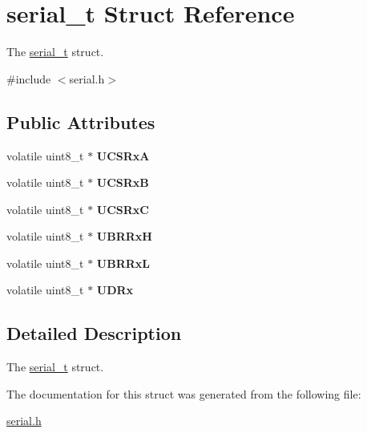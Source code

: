 \hypertarget{structserial__t}{}\section{serial\+\_\+t Struct Reference}
\label{structserial__t}


The \hyperlink{structserial__t}{serial\+\_\+t} struct.  




{\ttfamily \#include $<$serial.\+h$>$}

\subsection*{Public Attributes}
\begin{DoxyCompactItemize}
\item 
\mbox{\label{structserial__t_a217e81ee8801f862b447e651016bb71b}} 
volatile uint8\+\_\+t $\ast$ {\bfseries U\+C\+S\+RxA}
\item 
\mbox{\label{structserial__t_a2e14c00b5f729305a98f44927d91fa65}} 
volatile uint8\+\_\+t $\ast$ {\bfseries U\+C\+S\+RxB}
\item 
\mbox{\label{structserial__t_aeb6357850a478ff1c9f50f342764ed3a}} 
volatile uint8\+\_\+t $\ast$ {\bfseries U\+C\+S\+RxC}
\item 
\mbox{\label{structserial__t_ae458e42ede033302f20deeb82d51d282}} 
volatile uint8\+\_\+t $\ast$ {\bfseries U\+B\+R\+RxH}
\item 
\mbox{\label{structserial__t_a9f1c7df5c88c819e1b858fede2735e82}} 
volatile uint8\+\_\+t $\ast$ {\bfseries U\+B\+R\+RxL}
\item 
\mbox{\label{structserial__t_a4bdffabefd1f4ca2c15c249ff6300510}} 
volatile uint8\+\_\+t $\ast$ {\bfseries U\+D\+Rx}
\end{DoxyCompactItemize}


\subsection{Detailed Description}
The \hyperlink{structserial__t}{serial\+\_\+t} struct. 

The documentation for this struct was generated from the following file\+:\begin{DoxyCompactItemize}
\item 
\hyperlink{serial_8h}{serial.\+h}\end{DoxyCompactItemize}
